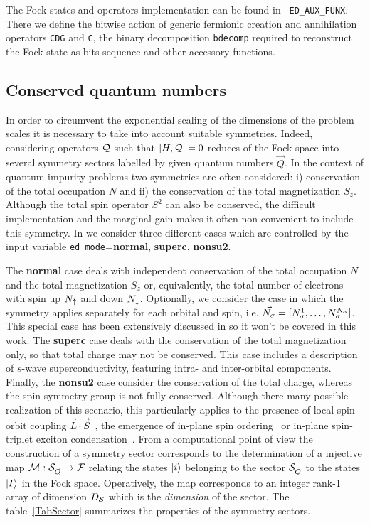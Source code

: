 \documentclass[edipack2.tex]{subfiles}
\begin{document}
The Fock states and operators implementation can be found in {\tt
  ED\_AUX\_FUNX}. There we define the bitwise action of generic fermionic creation
and annihilation operators {\tt CDG} and {\tt C}, the binary
decomposition {\tt bdecomp} required to reconstruct the Fock state as
bits sequence and other accessory functions. 

\subsection{Conserved quantum numbers}\label{sSecQNs}
In order to circumvent the exponential scaling of the dimensions of
the problem scales it is necessary to take into account suitable symmetries.
Indeed, considering operators ${\cal Q}$ such that $[H, {\cal Q}]=0$
reduces of the Fock space into several symmetry sectors
labelled by given quantum numbers $\vec{Q}$. 
In the context of quantum impurity problems two symmetries are often considered: i)
conservation of the total occupation $N$ and ii) the
conservation of the total magnetization $S_z$. Although the total spin
operator $S^2$ can also be conserved, the difficult  implementation
and the marginal gain makes it often non convenient to include this symmetry.
In \NAME we consider three different cases which are controlled by the
input variable {\tt ed\_mode}={\bf normal}, {\bf superc}, {\bf
  nonsu2}. 

The {\bf normal} case deals with independent conservation of the total occupation $N$
and the total magnetization $S_z$ or, equivalently, the total number of electrons with spin up $N_\uparrow$ and down
$N_\downarrow$. Optionally, we consider the case in which the symmetry
applies separately for each orbital and spin,
i.e. $\vec{N_\sigma}=[N^1_\sigma,\dots,N^{N_\alpha}_\sigma]$. This special case has been
extensively discussed in  so it won't be covered in
this work.
%
The {\bf superc} case deals with the conservation of the total
magnetization only, so that total charge may not be conserved. This
case includes a description of $s$-wave superconductivity, featuring
intra- and inter-orbital components.
%
Finally, the {\bf nonsu2} case consider the conservation of the total
charge, whereas the spin symmetry group is not fully
conserved. Although there many possible realization of this scenario,
this particularly applies to the presence of local spin-orbit coupling
$\vec{L}\cdot\vec{S}$~\cite{something}, the emergence of in-plane spin ordering~\cite{BellomiaKMH} or
in-plane spin-triplet exciton condensation~\cite{Amaricci2023_excitons,Blason}.  
%
From a computational point of view the construction of a symmetry
sector corresponds to the determination of a injective map
${\cal M}:{\cal S}_{\vec{Q}}\rightarrow {\cal F}$ relating the states $|i\rangle$
belonging to the sector ${\cal S}_{\vec{Q}}$ to the states $|I\rangle$ in the
Fock space. Operatively, the map corresponds to an integer rank-1
array of dimension $D_{\cal S}$ which is the {\it dimension} of the
sector. 
The table~\ref{TabSector} summarizes the properties of the symmetry
sectors. 
\end{document}
